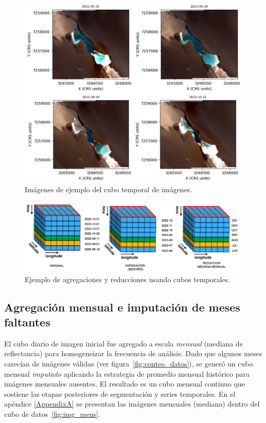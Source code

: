 \begin{figure}[H]
        \centering
        \includegraphics[scale=.25]
        {Figures/agg_mens.png}
        \caption{Imágenes de ejemplo del cubo temporal de imágenes.}
        \label{fig:agg_mens}
\end{figure}

\begin{figure}[H]
        \centering
        \includegraphics[scale=.25]
        {Figures/cube.png}
        \caption{Ejemplo de agregaciones y reducciones usando cubos temporales.}
        \label{fig:img_mens_agg}
\end{figure}


\subsection{Agregación mensual e imputación de meses faltantes}
El cubo diario de imagen inicial fue agregado a escala \emph{mensual} (mediana de reflectancia) para homogeneizar la frecuencia de análisis. Dado que algunos meses carecían de imágenes válidas (ver figura~\ref{fig:conteo_datos}), se generó un cubo mensual \emph{imputado} aplicando la estrategia de promedio mensual histórico para imágenes mensuales ausentes. El resultado es un cubo mensual continuo que sostiene las etapas posteriores de segmentación y series temporales. En el apéndice \ref{AppendixA} se presentan las imágenes mensuales (mediana) dentro del cubo de datos~\ref{fig:img_mens}.

